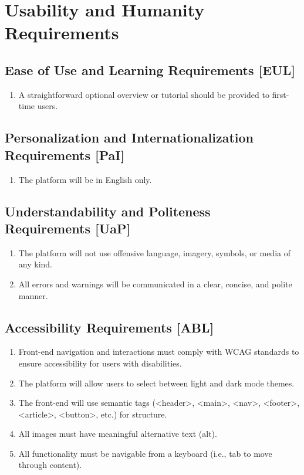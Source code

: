 \documentclass[12pt]{article}
\begin{document}
\section{Usability and Humanity Requirements}
  \subsection{Ease of Use and Learning Requirements [EUL]}
    \begin{enumerate}
      \item A straightforward optional overview or tutorial should be provided to first-time users.
    \end{enumerate}

  \subsection{Personalization and Internationalization Requirements [PaI]}
    \begin{enumerate}
      \item The platform will be in English only.
    \end{enumerate}

  \subsection{Understandability and Politeness Requirements [UaP]}
    \begin{enumerate}
      \item The platform will not use offensive language, imagery, symbols, or media of any kind.
      \item All errors and warnings will be communicated in a clear, concise, and polite manner.
    \end{enumerate}

  \subsection{Accessibility Requirements [ABL]}
    \begin{enumerate}
      \item Front-end navigation and interactions must comply with WCAG standards to ensure accessibility for users with disabilities.
      \item The platform will allow users to select between light and dark mode themes.
      \item The front-end will use semantic tags (<header>, <main>, <nav>, <footer>, <article>, <button>, etc.) for structure.
      \item All images must have meaningful alternative text (alt).
      \item All functionality must be navigable from a keyboard (i.e., tab to move through content).
    \end{enumerate}
\end{document}
